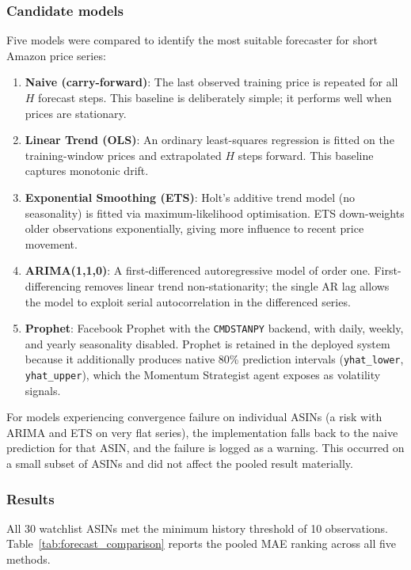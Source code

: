 \subsubsection*{Candidate models}

Five models were compared to identify the most suitable forecaster for short Amazon price series:

\begin{enumerate}
  \item \textbf{Naive (carry-forward)}: The last observed training price is repeated for all $H$ forecast steps. This baseline is deliberately simple; it performs well when prices are stationary.
  \item \textbf{Linear Trend (OLS)}: An ordinary least-squares regression is fitted on the training-window prices and extrapolated $H$ steps forward. This baseline captures monotonic drift.
  \item \textbf{Exponential Smoothing (ETS)}: Holt's additive trend model (no seasonality) is fitted via maximum-likelihood optimisation. ETS down-weights older observations exponentially, giving more influence to recent price movement.
  \item \textbf{ARIMA(1,1,0)}: A first-differenced autoregressive model of order one. First-differencing removes linear trend non-stationarity; the single AR lag allows the model to exploit serial autocorrelation in the differenced series.
  \item \textbf{Prophet}: Facebook Prophet with the \texttt{CMDSTANPY} backend, with daily, weekly, and yearly seasonality disabled. Prophet is retained in the deployed system because it additionally produces native 80\% prediction intervals (\texttt{yhat\_lower}, \texttt{yhat\_upper}), which the Momentum Strategist agent exposes as volatility signals.
\end{enumerate}

For models experiencing convergence failure on individual ASINs (a risk with ARIMA and ETS on very flat series), the implementation falls back to the naive prediction for that ASIN, and the failure is logged as a warning. This occurred on a small subset of ASINs and did not affect the pooled result materially.

\subsubsection*{Results}

All 30 watchlist ASINs met the minimum history threshold of 10 observations. Table~\ref{tab:forecast_comparison} reports the pooled MAE ranking across all five methods.

